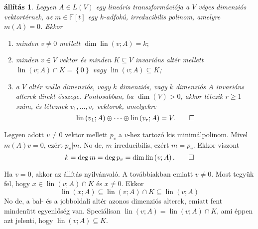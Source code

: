 \documentclass[9pt, a4paper, showtrims]{memoir}
\makeatletter
\renewenvironment{proof}[1][\proofname]
    {\par\pushQED{\qed}%
    \normalfont \topsep6\p@\@plus6\p@\relax
    \trivlist
    \item[\hskip\labelsep
        \itshape
    #1\@addpunct{:}]\ignorespaces}
    {\popQED\endtrivlist\@endpefalse}
\theoremstyle{plain}
\newtheorem{proposition}{állítás}[chapter]
\theoremstyle{remark}
\theoremstyle{definition}
\DeclareMathOperator{\lin}{lin}
\makeatother
\begin{document}
\begin{proposition}\label{pr:irred_redukcio}
	Legyen $A\in L\left( V \right)$ egy lineáris transzformációja a $V$ véges dimenziós vektortérnek,
	az $m\in\mathbb{F}\left[ t \right]$ egy $k$-adfokú, irreducibilis polinom, amelyre $m\left( A \right)=0$.
	Ekkor
	\begin{enumerate}
		\item minden $v\neq 0$ mellett
		      \begin{math}
			      \dim\lin\left( v;A \right)=k;
		      \end{math}
		\item
		      minden $v\in V$ vektor és minden $K\subseteq V$ invariáns altér mellett
		      $\lin\left( v;A \right)\cap K=\left\{ 0 \right\}$ vagy
		      $\lin\left( v;A \right)\subseteq K$;
		\item
		      a $V$ altér nulla dimenziós,
		      vagy $k$ dimenziós,
		      vagy $k$ dimenziós $A$ invariáns alterek direkt összege.
		      Pontosabban,
		      ha $\dim(V)>0$, akkor létezik $r\geq 1$ szám,
		      és léteznek $v_1,\ldots,v_r$ vektorok, amelyekre
		      \[
			      \lin\left( v_1;A \right)\oplus\dots\oplus \lin\left( v_r;A \right)=V.
			      \qedhere
		      \]
	\end{enumerate}
\end{proposition}
\begin{proof}[Bizonyítás (1.)]
	Legyen adott $v\neq 0$ vektor mellett $p_v$ a $v$-hez tartozó kis minimálpolinom.
	Mivel $m\left( A \right)v=0$, ezért $p_v|m$.
	No de, $m$ irreducibilis, ezért $m=p_v$.
	Ekkor viszont
	\[
		k=\deg m=\deg p_v
		=
		\dim\lin\left( v;A \right).\qedhere
	\]
\end{proof}
\begin{proof}[Bizonyítás (2.)]
	Ha $v=0$, akkor az állítás nyilvánvaló.
	A továbbiakban emiatt $v\neq 0$.
	Most tegyük fel, hogy $x\in\lin\left( v;A \right)\cap K$ és $x\neq 0$.
	Ekkor
	\[
		\lin\left( x;A \right)
		\subseteq
		\lin\left( v;A \right)\cap K
		\subseteq
		\lin\left( v;A \right)
	\]
	No de,
	a bal- és a jobboldali altér azonos dimenziós alterek,
	emiatt fent mindenütt egyenlőség van.
	Speciálisan
	$\lin\left( v;A \right)=\lin\left( v;A \right)\cap K$,
	ami éppen azt jelenti,
	hogy
	$\lin\left( v;A \right)\subseteq K.$
\end{proof}
\end{document}
